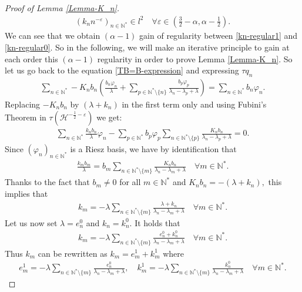 \documentclass[10pt,a4paper]{amsart}
\begin{document}
\begin{proof}[Proof of Lemma \ref{Lemma-K_n}]
\begin{align}
 (k_n n^{-\varepsilon})_{n\in\mathbb{N}^*}\in l^2 \quad \forall \varepsilon\in \left(\frac{3}{2}-\alpha, \alpha-\frac{1}{2}\right).\label{kn-regular1}  
\end{align}
We can see that we obtain $(\alpha-1)$ gain of regularity between \eqref{kn-regular1} and \eqref{kn-regular0}. So in the following, we will make an iterative principle to gain at each order this $(\alpha-1)$ regularity in order to prove Lemma \ref{Lemma-K_n}. So let us go back to the equation \eqref{TB=B-expression} and expressing $\tau q_n$
\begin{align*}
    \sum_{n\in \mathbb{N}^*}-K_n b_n\left(\frac{b_n\varphi_n}{\lambda}+\sum_{p\in \mathbb{N}^*\setminus\{n\}}\frac{b_p\varphi_p}{\lambda_n-\lambda_p+\lambda}\right)=\sum_{n\in \mathbb{N}^*}b_n\varphi_n.
\end{align*}
Replacing $-K_n b_n$ by $(\lambda+k_n)$ in the first term only and using Fubini's Theorem in $\tau(\mathcal{H}^{-\frac{1}{2}-\varepsilon})$ we get:
\begin{align*}
  \sum_{n\in \mathbb{N}^*}\frac{k_n b_n}{\lambda}\varphi_n-\sum_{p\in \mathbb{N}^*}b_p\varphi_p\sum_{n\in \mathbb{N}^*\setminus\{p\}}\frac{K_n b_n}{\lambda_n-\lambda_p+\lambda}=0.  
\end{align*}
Since $(\varphi_n)_{n\in \mathbb{N}^*}$ is a Riesz basis, we have by identification that
\begin{align*}
  \frac{k_m b_m}{\lambda}=b_m\sum_{n\in \mathbb{N}^*\setminus\{m\}}\frac{K_n b_n}{\lambda_n-\lambda_m+\lambda}\quad \forall m\in \mathbb{N}^*.  
\end{align*}
Thanks to the fact that $b_m\neq 0$ for all $m\in \mathbb{N}^*$ and $K_n b_n=-(\lambda+k_n),$ this implies that 
\begin{align*}
  k_m=-\lambda\sum_{n\in \mathbb{N}^*\setminus\{m\}}\frac{\lambda+k_n}{\lambda_n-\lambda_m+\lambda}\quad \forall m\in \mathbb{N}^*.  
\end{align*}
Let us now set $\lambda=e_n^0$ and $k_n=k_n^0.$ It holds that
\begin{align}
  k_m=-\lambda\sum_{n\in \mathbb{N}^*\setminus\{m\}}\frac{e_n^0+k_n^0}{\lambda_n-\lambda_m+\lambda}\quad \forall m\in \mathbb{N}^*.  \label{kn-def}
\end{align}
Thus $k_m$ can be rewritten as $k_m=e_m^1+k_m^1$ where
\begin{align*}
    e_m^1=-\lambda\sum_{n\in \mathbb{N}^*\setminus\{m\}}\frac{e_n^0}{\lambda_n-\lambda_m+\lambda}, \quad k_m^1=-\lambda\sum_{n\in \mathbb{N}^*\setminus\{m\}}\frac{k_n^0}{\lambda_n-\lambda_m+\lambda} \quad \forall m\in \mathbb{N}^*.

\end{align*}
\end{proof}
\end{document}

